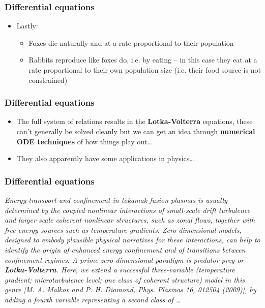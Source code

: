 \documentclass{beamer}
\begin{document}
\begin{frame}
  \frametitle{Differential equations}
  \begin{itemize}
    \item<1-> Lastly:
      \begin{itemize}
	\item<2-> Foxes die naturally and at a rate proportional to their population
	\item<3-> Rabbits reproduce like foxes do, i.e. by eating -- in this case they eat at a rate proportional to their own population size (i.e. their food source is not constrained)
      \end{itemize}
  \end{itemize}
\end{frame}

\begin{frame}
  \frametitle{Differential equations}
  \begin{itemize}
    \item<1-> The full system of relations results in the \textbf{Lotka-Volterra} equations, these can't generally be solved cleanly but we can get an idea through \textbf{numerical ODE techniques} of how things play out\ldots
    \item<2-> They also apparently have some applications in physics\ldots
  \end{itemize}
\end{frame}

\begin{frame}
  \frametitle{Differential equations}
  \textit{Energy transport and confinement in tokamak fusion plasmas is usually determined by the coupled nonlinear interactions of small-scale drift turbulence and larger scale coherent nonlinear structures, such as zonal flows, together with free energy sources such as temperature gradients. Zero-dimensional models, designed to embody plausible physical narratives for these interactions, can help to identify the origin of enhanced energy confinement and of transitions between confinement regimes. A prime zero-dimensional paradigm is predator-prey or \textbf{Lotka-Volterra}. Here, we extend a successful three-variable (temperature gradient; microturbulence level; one class of coherent structure) model in this genre [M. A. Malkov and P. H. Diamond, Phys. Plasmas 16, 012504 (2009)], by adding a fourth variable representing a second class of  \ldots}
\end{frame}
\end{document}
